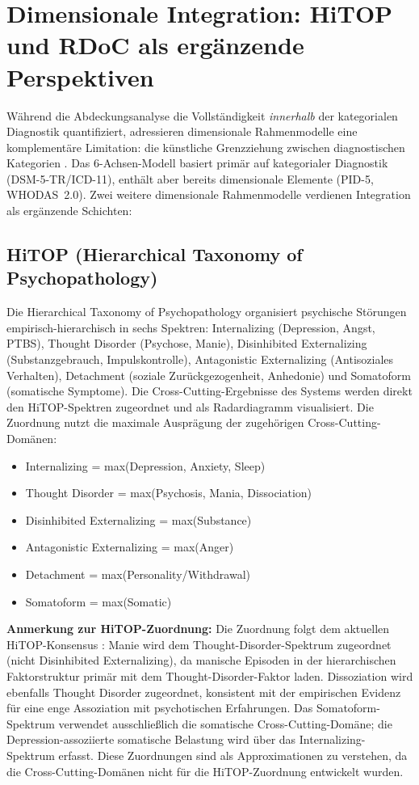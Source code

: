\documentclass[11pt,a4paper]{article}
\begin{document}
\section{Dimensionale Integration: HiTOP und RDoC als erg\"anzende Perspektiven}
\label{sec:dimensional}

W\"ahrend die Abdeckungsanalyse die Vollst\"andigkeit \textit{innerhalb} der kategorialen Diagnostik quantifiziert, adressieren dimensionale Rahmenmodelle eine komplement\"are Limitation: die k\"unstliche Grenzziehung zwischen diagnostischen Kategorien \citep{Rosenman2003}. Das 6-Achsen-Modell basiert prim\"ar auf kategorialer Diagnostik (DSM-5-TR/ICD-11), enth\"alt aber bereits dimensionale Elemente (PID-5, WHODAS~2.0). Zwei weitere dimensionale Rahmenmodelle verdienen Integration als erg\"anzende Schichten:

\subsection{HiTOP (Hierarchical Taxonomy of Psychopathology)}

Die Hierarchical Taxonomy of Psychopathology \citep{Kotov2017, Kotov2022, Krueger2018} organisiert psychische St\"orungen empirisch-hierarchisch in sechs Spektren: Internalizing (Depression, Angst, PTBS), Thought Disorder (Psychose, Manie), Disinhibited Externalizing (Substanzgebrauch, Impulskontrolle), Antagonistic Externalizing (Antisoziales Verhalten), Detachment (soziale Zur\"uckgezogenheit, Anhedonie) und Somatoform (somatische Symptome). Die Cross-Cutting-Ergebnisse des Systems werden direkt den HiTOP-Spektren zugeordnet und als Radardiagramm visualisiert. Die Zuordnung nutzt die maximale Auspr\"agung der zugeh\"origen Cross-Cutting-Dom\"anen:

\begin{itemize}[noitemsep]
\item Internalizing = max(Depression, Anxiety, Sleep)
\item Thought Disorder = max(Psychosis, Mania, Dissociation)
\item Disinhibited Externalizing = max(Substance)
\item Antagonistic Externalizing = max(Anger)
\item Detachment = max(Personality/Withdrawal)
\item Somatoform = max(Somatic)
\end{itemize}

\textbf{Anmerkung zur HiTOP-Zuordnung:} Die Zuordnung folgt dem aktuellen HiTOP-Konsensus \citep{Kotov2021}: Manie wird dem Thought-Disorder-Spektrum zugeordnet (nicht Disinhibited Externalizing), da manische Episoden in der hierarchischen Faktorstruktur prim\"ar mit dem Thought-Disorder-Faktor laden. Dissoziation wird ebenfalls Thought Disorder zugeordnet, konsistent mit der empirischen Evidenz f\"ur eine enge Assoziation mit psychotischen Erfahrungen. Das Somatoform-Spektrum verwendet ausschlie\ss{}lich die somatische Cross-Cutting-Dom\"ane; die Depression-assoziierte somatische Belastung wird \"uber das Internalizing-Spektrum erfasst. Diese Zuordnungen sind als Approximationen zu verstehen, da die Cross-Cutting-Dom\"anen nicht f\"ur die HiTOP-Zuordnung entwickelt wurden.
\end{document}
